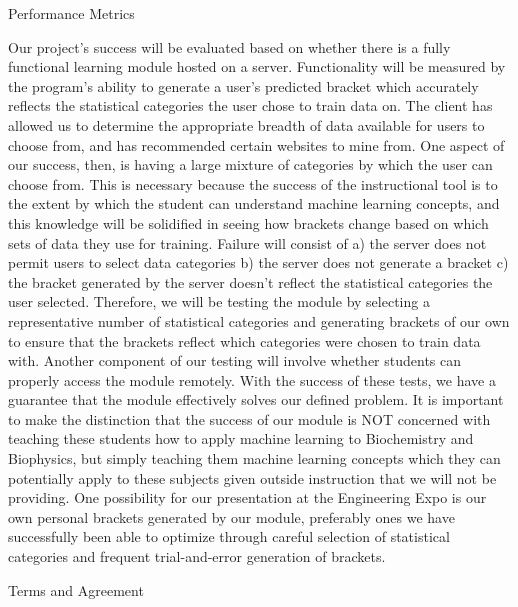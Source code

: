 \documentclass[letterpaper,20pt,titlepage]{article}
\begin{document}
\begin{section}{Performance Metrics}


Our project's success will be evaluated based on whether there is a fully functional learning module hosted on a server. Functionality will be measured by the program's ability to generate a user's predicted bracket which accurately reflects the statistical categories the user chose to train data on. The client has allowed us to determine the appropriate breadth of data available for users to choose from, and has recommended certain websites to mine from. One aspect of our success, then, is having a large mixture of categories by which the user can choose from. This is necessary because the success of the instructional tool is to the extent by which the student can understand machine learning concepts, and this knowledge will be solidified in seeing how brackets change based on which sets of data they use for training. Failure will consist of a) the server does not permit users to select data categories b) the server does not generate a bracket c) the bracket generated by the server doesn't reflect the statistical categories the user selected. Therefore, we will be testing the module by selecting a representative number of statistical categories and generating brackets of our own to ensure that the brackets reflect which categories were chosen to train data with. Another component of our testing will involve whether students can properly access the module remotely. With the success of these tests, we have a guarantee that the module effectively solves our defined problem. It is important to make the distinction that the success of our module is NOT concerned with teaching these students how to apply machine learning to Biochemistry and Biophysics, but simply teaching them machine learning concepts which they can potentially apply to these subjects given outside instruction that we will not be providing. One possibility for our presentation at the Engineering Expo is our own personal brackets generated by our module, preferably ones we have successfully been able to optimize through careful selection of statistical categories and frequent trial-and-error generation of brackets.
\bigbreak
\bigbreak
\bigbreak
\end{section}

\newpage
\begin{section}{Terms and Agreement}
\bigbreak
\bigbreak
\bigbreak

\end{section}
\end{document}
